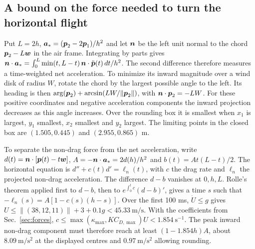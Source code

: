 \subsection{A bound on the force needed to turn the horizontal flight}
\label{app:bend}
Put \(L=2h\), \(\boldsymbol{a}_*=(\boldsymbol{p}_2-2\boldsymbol{p}_1)/h^2\) and let \(\boldsymbol{n}\) be the left unit normal to the chord \(\boldsymbol{p}_2-L\boldsymbol{w}\) in the air frame. Integrating by parts gives \(\boldsymbol{n}\cdot\boldsymbol{a}_*=\int_0^L \min(t,L-t)\,\boldsymbol{n}\cdot\ddot{\boldsymbol{p}}(t)\,dt/h^2\). The second difference therefore measures a time-weighted net acceleration. To minimize its inward magnitude over a wind disk of radius \(W\), rotate the chord by the largest possible angle to the left. Its heading is then \(\arg(\boldsymbol{p}_2)+\arcsin(LW/\|\boldsymbol{p}_2\|)\), with \(\boldsymbol{n}\cdot\boldsymbol{p}_2=-LW\). For these positive coordinates and negative acceleration components the inward projection decreases as this angle increases. Over the rounding box it is smallest when \(x_1\) is largest, \(y_1\) smallest, \(x_2\) smallest and \(y_2\) largest. The limiting points in the closed box are \((1.505,0.445)\) and \((2.955,0.865)\) m.

To separate the non-drag force from the net acceleration, write \(d(t)=\boldsymbol{n}\cdot[\boldsymbol{p}(t)-t\boldsymbol{w}]\), \(A=-\boldsymbol{n}\cdot\boldsymbol{a}_*=2d(h)/h^2\) and \(b(t)=A t(L-t)/2\). The horizontal equation is \(d''+c(t)d'=\ell_n(t)\), with \(c\) the drag rate and \(\ell_n\) the projected non-drag acceleration. The difference \(d-b\) vanishes at \(0,h,L\). Rolle's theorem applied first to \(d-b\), then to \(e^{\int_0^t c}(d-b)'\), gives a time \(s\) such that \(-\ell_n(s)=A[1-c(s)(h-s)]\). Over the first 100 ms, \(\dot U\le g\) gives \(U\le\lVert(38,12,11)\rVert+3+0.1g<45.33\ \mathrm{m/s}\). With the coefficients from Sec.~\ref{sec:forces}, \(c\le\max(\kappa_{\max},K C_{D,\max})U<1.854\ \mathrm{s^{-1}}\). The peak inward non-drag component must therefore reach at least \((1-1.854h)A\), about \(8.09\ \mathrm{m/s^2}\) at the displayed centres and \(0.97\ \mathrm{m/s^2}\) allowing rounding.

